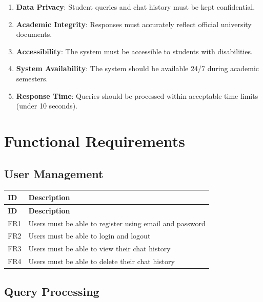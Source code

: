\documentclass[12pt,a4paper]{book}
\numberwithin{table}{chapter}
\numberwithin{figure}{chapter}
\numberwithin{equation}{chapter}
\begin{document}
\begin{enumerate}
    \item \textbf{Data Privacy}: Student queries and chat history must be kept confidential.

    \item \textbf{Academic Integrity}: Responses must accurately reflect official university documents.

    \item \textbf{Accessibility}: The system must be accessible to students with disabilities.

    \item \textbf{System Availability}: The system should be available 24/7 during academic semesters.

    \item \textbf{Response Time}: Queries should be processed within acceptable time limits (under 10 seconds).
\end{enumerate}

\section{Functional Requirements}

\subsection{User Management}

\begin{longtable}{|p{0.5in}|p{4in}|}
\hline
\textbf{ID} & \textbf{Description}\\
\hline
\endfirsthead
\hline
\textbf{ID} & \textbf{Description}\\
\hline
\endhead
\hline
FR1 & Users must be able to register using email and password\\
\hline
FR2 & Users must be able to login and logout\\
\hline
FR3 & Users must be able to view their chat history\\
\hline
FR4 & Users must be able to delete their chat history\\
\hline
\end{longtable}

\subsection{Query Processing}
\end{document}
